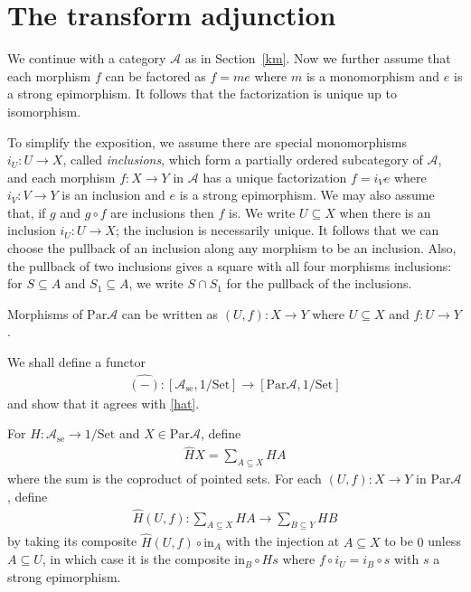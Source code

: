 \documentclass[a4paper,12pt,reqno]{amsart}
\theoremstyle{definition}
\theoremstyle{fact}
\theoremstyle{genquest}
\theoremstyle{step}
\newcommand{\lra}{\longrightarrow}
\def\CA{{\mathscr A}}
\begin{document}
\section{The transform adjunction}\label{ta}

We continue with a category $\CA$ as in Section~\ref{km}.
Now we further assume that each morphism $f$ can be factored as $f = me$
where $m$ is a monomorphism and $e$ is a strong epimorphism.
It follows that the factorization is unique up to isomorphism.

To simplify the exposition, we assume there are special monomorphisms
$i_U : U \lra X$, called {\em inclusions}, which form a partially ordered
subcategory of $\CA$, and each morphism $f : X \lra Y$ in $\CA$ has a unique 
factorization $f = i_V e$ where $i_V : V \lra Y$ is an inclusion and 
$e$ is a strong epimorphism.
We may also assume that, if $g$ and $g\circ f$ are inclusions then $f$ is.
We write $U\subseteq X$ when there is an inclusion $i_U : U \lra X$;
the inclusion is necessarily unique.
It follows that we can choose the pullback of an inclusion along any morphism
to be an inclusion. 
Also, the pullback of two inclusions gives a square with all four morphisms inclusions: for $S\subseteq A$ and $S_1\subseteq A$, we write $S\cap S_1$
for the pullback of the inclusions.

Morphisms of $\mathrm{Par}\CA$ can be written as $(U,f) : X \lra Y$
where $U\subseteq X$ and $f:U\lra Y$. 

We shall define a functor
\begin{eqnarray}\label{hat2}
\widehat{(-)} : [\CA_{\mathrm{se}}, 1/\mathrm{Set}] \lra [\mathrm{Par}\CA, 1/\mathrm{Set}] 
\end{eqnarray}
and show that it agrees with \eqref{hat}.

For $H : \CA_{\mathrm{se}} \lra 1/\mathrm{Set}$ and $X\in \mathrm{Par}\CA$, define
\begin{eqnarray}\label{hatformula}
\widehat{H}X = \sum_{A\subseteq X}{HA}
\end{eqnarray}
where the sum is the coproduct of pointed sets.
For each $(U,f) : X \lra Y$ in $\mathrm{Par}\CA$, define
\begin{eqnarray}
\widehat{H}(U,f) : \sum_{A\subseteq X}{HA} \lra \sum_{B\subseteq Y}{HB} 
\end{eqnarray} 
by taking its composite $\widehat{H}(U,f) \circ \mathrm{in}_A$ with the injection
at $A\subseteq X$ to be $0$ unless $A\subseteq U$, in which case it is the
composite $\mathrm{in}_B \circ Hs$ where $f \circ i_U = i_B \circ s$ with $s$
a strong epimorphism. 
\end{document}
